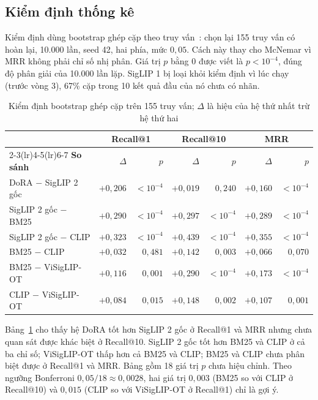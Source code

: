 \subsection{Kiểm định thống kê}
\label{sec:kiem-dinh}

Kiểm định dùng bootstrap ghép cặp theo truy vấn~\cite{efron1993bootstrap}: chọn lại 155 truy vấn có hoàn lại, 10.000 lần, seed 42, hai phía, mức $0{,}05$. Cách này thay cho McNemar vì MRR không phải chỉ số nhị phân. Giá trị $p$ bằng $0$ được viết là $p < 10^{-4}$, đúng độ phân giải của 10.000 lần lặp. SigLIP 1 bị loại khỏi kiểm định vì lúc chạy (trước vòng 3), 67\% cặp trong 10 kết quả đầu của nó chưa có nhãn.

\begin{table}[H]
\centering
\caption{Kiểm định bootstrap ghép cặp trên 155 truy vấn; $\Delta$ là hiệu của hệ thứ nhất trừ hệ thứ hai}
\label{tab:kiem-dinh}
\footnotesize
\setlength{\tabcolsep}{4pt}
\renewcommand{\arraystretch}{1.05}
\begin{tabular}{@{}l r r r r r r@{}}
\toprule
 & \multicolumn{2}{c}{\textbf{Recall@1}} & \multicolumn{2}{c}{\textbf{Recall@10}} & \multicolumn{2}{c}{\textbf{MRR}} \\
\cmidrule(lr){2-3}\cmidrule(lr){4-5}\cmidrule(lr){6-7}
\textbf{So sánh} & $\Delta$ & $p$ & $\Delta$ & $p$ & $\Delta$ & $p$ \\
\midrule
DoRA $-$ SigLIP 2 gốc & $+0{,}206$ & $<10^{-4}$ & $+0{,}019$ & $0{,}240$ & $+0{,}160$ & $<10^{-4}$ \\
SigLIP 2 gốc $-$ BM25 & $+0{,}290$ & $<10^{-4}$ & $+0{,}297$ & $<10^{-4}$ & $+0{,}289$ & $<10^{-4}$ \\
SigLIP 2 gốc $-$ CLIP & $+0{,}323$ & $<10^{-4}$ & $+0{,}439$ & $<10^{-4}$ & $+0{,}355$ & $<10^{-4}$ \\
BM25 $-$ CLIP & $+0{,}032$ & $0{,}481$ & $+0{,}142$ & $0{,}003$ & $+0{,}066$ & $0{,}070$ \\
BM25 $-$ ViSigLIP-OT & $+0{,}116$ & $0{,}001$ & $+0{,}290$ & $<10^{-4}$ & $+0{,}173$ & $<10^{-4}$ \\
CLIP $-$ ViSigLIP-OT & $+0{,}084$ & $0{,}015$ & $+0{,}148$ & $0{,}002$ & $+0{,}107$ & $0{,}001$ \\
\bottomrule
\end{tabular}
\end{table}

Bảng~\ref{tab:kiem-dinh} cho thấy hệ DoRA tốt hơn SigLIP 2 gốc ở Recall@1 và MRR nhưng chưa quan sát được khác biệt ở Recall@10. SigLIP 2 gốc tốt hơn BM25 và CLIP ở cả ba chỉ số; ViSigLIP-OT thấp hơn cả BM25 và CLIP; BM25 và CLIP chưa phân biệt được ở Recall@1 và MRR. Bảng gồm 18 giá trị $p$ chưa hiệu chỉnh. Theo ngưỡng Bonferroni $0{,}05/18 \approx 0{,}0028$, hai giá trị $0{,}003$ (BM25 so với CLIP ở Recall@10) và $0{,}015$ (CLIP so với ViSigLIP-OT ở Recall@1) chỉ là gợi ý.

